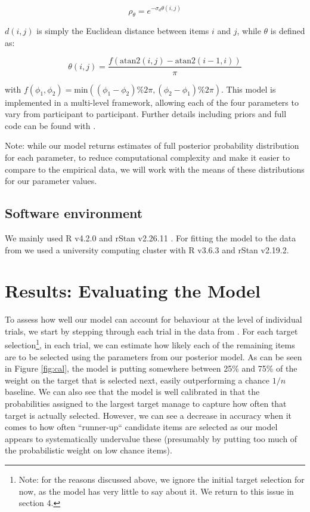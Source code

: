 \documentclass[preprints, article,submit,pdftex,moreauthors]{Definitions/mdpi}
\begin{document}
\begin{linenomath}
\begin{equation}
    \rho_{\theta} = e^{-\sigma_d\theta(i,j)}
\end{equation}
\end{linenomath}

$d(i,j)$ is simply the Euclidean distance between items $i$ and $j$, while $\theta$ is defined as:

\begin{linenomath}
\begin{equation}
    \theta(i,j) = \frac{f(\text{atan2}(i, j) - \text{atan2}(i-1, i))}{\pi}
\end{equation}
\end{linenomath}

with $f(\phi_1, \phi_2) = \text{min}((\phi_1 - \phi_2) \% 2\pi, (\phi_2 - \phi_1) \% 2\pi)$. This model is implemented in a multi-level framework, allowing each of the four parameters to vary from participant to participant. Further details including priors and full code can be found with \cite{clarke2022foraging}.

Note: while our model returns estimates of full posterior probability distribution for each parameter, to reduce computational complexity and make it easier to compare to the empirical data, we will work with the means of these distributions for our parameter values. 

\subsection{Software environment}
 
We mainly used R v4.2.0 and rStan v2.26.11 \cite{rstan}. For fitting the model to the data from \cite{clarke2022} we used a university computing cluster with R v3.6.3 and rStan v2.19.2.

\section{Results: Evaluating the Model}

To assess how well our model can account for behaviour at the level of individual trials, we start by stepping through each trial in the data from \cite{clarke2022}. For each target selection\footnote{Note: for the reasons discussed above, we ignore the initial target selection for now, as the model has very little to say about it. We return to this issue in section 4.}, in each trial, we can estimate how likely each of the remaining items are to be selected using the parameters from our posterior model. As can be seen in Figure \ref{fig:cal}, the model is putting somewhere between 25\% and 75\% of the weight on the target that is selected next, easily outperforming a chance $1/n$ baseline. We can also see  that the model is well calibrated in that the probabilities assigned to the largest target manage to capture how often that target is actually selected. However, we can see a decrease in accuracy when it comes to how often ``runner-up`` candidate items are selected as our model appears to systematically undervalue these (presumably by putting too much of the probabilistic weight on low chance items).
\end{document}
